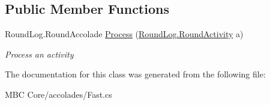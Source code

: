 \subsection*{Public Member Functions}
\begin{DoxyCompactItemize}
\item 
\hypertarget{class_m_b_c_1_1_core_1_1mbc_1_1accolades_1_1_fast_a83a0e38fc5d4ddcf5f6c57e7c3baa989}{Round\-Log.\-Round\-Accolade \hyperlink{class_m_b_c_1_1_core_1_1mbc_1_1accolades_1_1_fast_a83a0e38fc5d4ddcf5f6c57e7c3baa989}{Process} (\hyperlink{class_m_b_c_1_1_core_1_1_round_log_1_1_round_activity}{Round\-Log.\-Round\-Activity} a)}\label{class_m_b_c_1_1_core_1_1mbc_1_1accolades_1_1_fast_a83a0e38fc5d4ddcf5f6c57e7c3baa989}

\begin{DoxyCompactList}\small\item\em Process an activity\end{DoxyCompactList}\end{DoxyCompactItemize}


The documentation for this class was generated from the following file\-:\begin{DoxyCompactItemize}
\item 
M\-B\-C Core/accolades/Fast.\-cs\end{DoxyCompactItemize}
